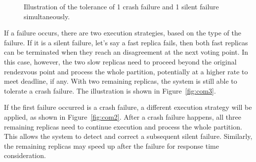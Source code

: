 \begin{figure}[!t]
	\begin{center}
	\end{center}
	\caption{Illustration of the tolerance of 1 crash failure and 1 silent failure simultaneously.}
	\label{fig:com_failure_model}
\end{figure}

If a failure occurs, there are two execution strategies, based on the type of the failure. If it is a silent failure, let's say a fast replica fails, then both fast replicas can be terminated when they reach an disagreement at the next voting point. In this case, however, the two slow replicas need to proceed beyond the original rendezvous point and process the whole partition, potentially at a higher rate to meet deadline, if any. With two remaining replicas, the system is still able to tolerate a crash failure. The illustration is shown in Figure~\ref{fig:com3}.

If the first failure occurred is a crash failure, a different execution strategy will be applied, as shown in Figure~\ref{fig:com2}. After a crash failure happens, all three remaining replicas need to continue execution and process the whole partition. This allows the system to detect and correct a subsequent silent failure. Similarly, the remaining replicas may speed up after the failure for response time consideration. 
